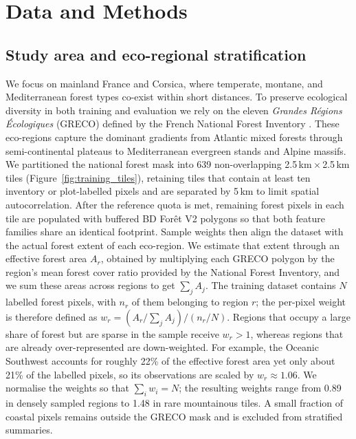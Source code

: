 \documentclass[utf8]{FrontiersinHarvard}
\begin{document}
\section{Data and Methods}

\subsection{Study area and eco-regional stratification}
\label{sec:greco}
We focus on mainland France and Corsica, where temperate, montane, and Mediterranean forest types co-exist within short distances. To preserve ecological diversity in both training and evaluation we rely on the eleven \emph{Grandes Régions Écologiques} (GRECO) defined by the French National Forest Inventory \citep{IGN2013GRECO}. These eco-regions capture the dominant gradients from Atlantic mixed forests through semi-continental plateaus to Mediterranean evergreen stands and Alpine massifs. We partitioned the national forest mask into 639 non-overlapping 2.5\,km\,$\times$\,2.5\,km tiles (Figure~\ref{fig:training_tiles}), retaining tiles that contain at least ten inventory or plot-labelled pixels and are separated by 5\,km to limit spatial autocorrelation. After the reference quota is met, remaining forest pixels in each tile are populated with buffered BD Forêt V2 polygons so that both feature families share an identical footprint. Sample weights then align the dataset with the actual forest extent of each eco-region. We estimate that extent through an effective forest area \(A_r\), obtained by multiplying each GRECO polygon by the region's mean forest cover ratio provided by the National Forest Inventory, and we sum these areas across regions to get \(\sum_{j} A_j\). The training dataset contains \(N\) labelled forest pixels, with \(n_r\) of them belonging to region \(r\); the per-pixel weight is therefore defined as \(w_r = (A_r / \sum_{j} A_j) / (n_r / N)\). Regions that occupy a large share of forest but are sparse in the sample receive \(w_r > 1\), whereas regions that are already over-represented are down-weighted. For example, the Oceanic Southwest accounts for roughly 22\% of the effective forest area yet only about 21\% of the labelled pixels, so its observations are scaled by \(w_r \approx 1.06\). We normalise the weights so that \(\sum_i w_i = N\); the resulting weights range from 0.89 in densely sampled regions to 1.48 in rare mountainous tiles. A small fraction of coastal pixels remains outside the GRECO mask and is excluded from stratified summaries.
\end{document}
